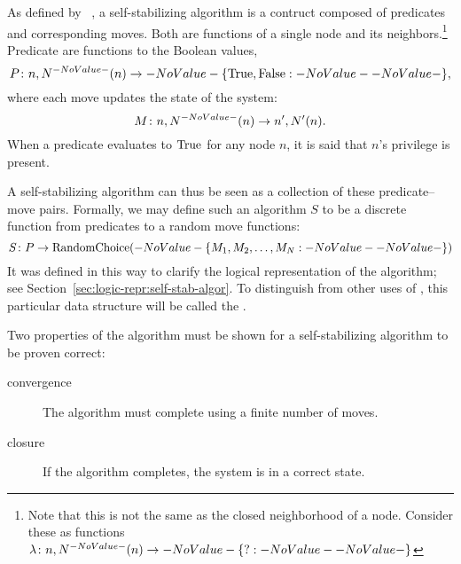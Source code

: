 As defined by \citeauthor{Dijkstra:1974:SSS:361179.361202}~\autocite{Dijkstra:1974:SSS:361179.361202},
  a self-stabilizing algorithm is a contruct composed of
  predicates and corresponding moves.
Both are functions of a single node and its neighbors.\footnote{%
  Note that this is not the same as the closed neighborhood of a node.
  Consider these as functions $\Function{n, \OpenNeighborhood{n}}{\Set ?}$}
Predicate are functions to the Boolean values,
  \begin{equation}
  \label{eq:define-predicate}
  \Function[P]{n, \OpenNeighborhood{n}}{\SetBoolean},
  \end{equation}
  where each move updates the state of the system:
  \begin{equation}
  \label{eq:define-move}
  \Function[M]{n, \OpenNeighborhood{n}}{n^\prime, \OpenNeighborhood[\prime]{n}}.
  \end{equation}
When a predicate evaluates to $\text{True}$ for any node $n$,
  it is said that $n$'s privilege is present.

A self-stabilizing algorithm can thus be seen as
  a collection of these predicate--move pairs.
Formally, we may define such an algorithm $S$ to be a discrete function
  from predicates to a random move functions:
  \begin{equation}
    \label{eq:define-ssalg}
    \Function[S]{P}{\operatorname{RandomChoice}(\Set{M_1, M_2, \dots, M_N})}
  \end{equation}
It was defined in this way to clarify the logical representation of the algorithm;
  see Section~\ref{sec:logic-repr:self-stab-algor}.
To distinguish from other uses of ,
  this particular data structure will be called the .

Two properties of the algorithm must be shown
  for a self-stabilizing algorithm to be proven correct:~\autocite{arora:closure-and-convergence}
\begin{description}
\item[convergence] The algorithm must complete using a finite number of moves.
\item[closure] If the algorithm completes, the system is in a correct state.
\end{description}

